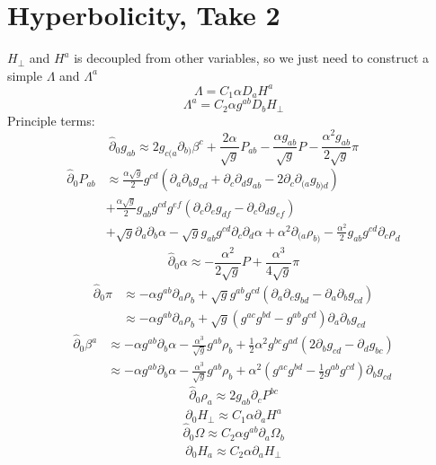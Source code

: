 \documentclass{article}
\begin{document}
\section{Hyperbolicity, Take 2}
$H_{\perp}$ and $H^{a}$ is decoupled from other variables, so we just need to construct a simple $\Lambda$ and $\Lambda^{a}$
\[
\Lambda = C_{1}\alpha D_{a}H^{a}
\]
\[
\Lambda^{a} = C_{2}\alpha g^{ab}D_{b}H_{\perp}
\]
Principle terms:
\[
{\hat \partial}_{0}g_{ab} \approx 2g_{c(a}\partial_{b)}\beta^{c} + \frac{2\alpha}{\sqrt{g}}P_{ab} - \frac{\alpha g_{ab}}{\sqrt{g}}P - \frac{\alpha^{2}g_{ab}}{2\sqrt{g}}\pi
\]
\begin{align*}
{\hat \partial}_{0}P_{ab} &\approx \frac{\alpha\sqrt{g}}{2}g^{cd}\left(\partial_{a}\partial_{b}g_{cd} + \partial_{c}\partial_{d}g_{ab} - 2\partial_{c}\partial_{(a}g_{b)d}\right)\\
& + \frac{\alpha\sqrt{g}}{2}g_{ab}g^{cd}g^{ef}\left(\partial_{c}\partial_{e}g_{df} - \partial_{c}\partial_{d}g_{ef}\right)\\
& + \sqrt{g}\partial_{a}\partial_{b}\alpha - \sqrt{g}g_{ab}g^{cd}\partial_{c}\partial_{d}\alpha + \alpha^{2}\partial_{(a}\rho_{b)} - \frac{\alpha^2}{2}g_{ab}g^{cd}\partial_{c}\rho_{d}
\end{align*}
\[
{\hat \partial}_{0}\alpha \approx -\frac{\alpha^{2}}{2\sqrt{g}}P + \frac{\alpha^{3}}{4\sqrt{g}}\pi
\]
\begin{align*}
{\hat \partial}_{0}\pi & \approx  -\alpha g^{ab}\partial_{a}\rho_{b} + \sqrt{g}g^{ab}g^{cd}\left(\partial_{a}\partial_{c}g_{bd} - \partial_{a}\partial_{b}g_{cd}\right)\\
& \approx  -\alpha g^{ab}\partial_{a}\rho_{b} + \sqrt{g}\left(g^{ac}g^{bd} - g^{ab}g^{cd}\right)\partial_{a}\partial_{b}g_{cd}
\end{align*}
\begin{align*}
{\hat \partial}_{0}\beta^{a} & \approx - \alpha g^{ab}\partial_{b}\alpha -\frac{\alpha^{3}}{\sqrt{g}}g^{ab} \rho_{b} + \frac{1}{2}\alpha^{2}g^{bc}g^{ad}\left(2\partial_{b}g_{cd} - \partial_{d}g_{bc}\right)\\
& \approx - \alpha g^{ab}\partial_{b}\alpha -\frac{\alpha^{3}}{\sqrt{g}}g^{ab} \rho_{b} + \alpha^{2}\left(g^{ac}g^{bd} - \frac{1}{2}g^{ab}g^{cd}\right)\partial_{b}g_{cd}
\end{align*}
\[
{\hat \partial}_{0}\rho_{a} \approx 2g_{ab}\partial_{c}P^{bc}
\]
\[
{\hat \partial}_{0}H_{\perp} \approx C_{1}\alpha \partial_{a}H^{a} 
\]
\[
{\hat \partial}_{0}\Omega \approx C_{2}\alpha g^{ab}\partial_{a}\Omega_{b}
\]
\[
{\hat \partial}_{0}H_{a} \approx C_{2}\alpha \partial_{a}H_{\perp} 
\]
\end{document}
